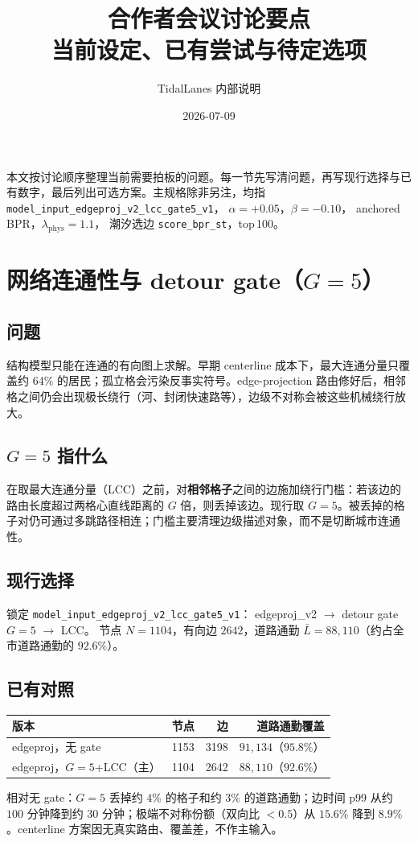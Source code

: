 \documentclass[11pt,a4paper]{article}
\title{合作者会议讨论要点\\[0.4em]
\large 当前设定、已有尝试与待定选项}
\author{TidalLanes 内部说明}
\date{2026-07-09}
\begin{document}
\maketitle

\noindent
本文按讨论顺序整理当前需要拍板的问题。每一节先写清问题，再写现行选择与已有数字，最后列出可选方案。主规格除非另注，均指
\texttt{model\_input\_edgeproj\_v2\_lcc\_gate5\_v1}，
$\alpha=+0.05$，$\beta=-0.10$，
anchored BPR，$\lambda_{\mathrm{phys}}=1.1$，
潮汐选边 \texttt{score\_bpr\_st}，top\,100。

\tableofcontents
\vspace{1em}

\section{网络连通性与 detour gate（$G=5$）}

\subsection*{问题}
结构模型只能在连通的有向图上求解。早期 centerline 成本下，最大连通分量只覆盖约 $64\%$ 的居民；孤立格会污染反事实符号。edge-projection 路由修好后，相邻格之间仍会出现极长绕行（河、封闭快速路等），边级不对称会被这些机械绕行放大。

\subsection*{$G=5$ 指什么}
在取最大连通分量（LCC）之前，对\textbf{相邻格子}之间的边施加绕行门槛：若该边的路由长度超过两格心直线距离的 $G$ 倍，则丢掉该边。现行取 $G=5$。被丢掉的格子对仍可通过多跳路径相连；门槛主要清理边级描述对象，而不是切断城市连通性。

\subsection*{现行选择}
锁定 \texttt{model\_input\_edgeproj\_v2\_lcc\_gate5\_v1}：
edgeproj\_v2 $\to$ detour gate $G=5$ $\to$ LCC。
节点 $N=1104$，有向边 $2642$，道路通勤 $\bar L=88{,}110$（约占全市道路通勤的 $92.6\%$）。

\subsection*{已有对照}
\begin{center}
\begin{tabular}{lrrr}
\toprule
版本 & 节点 & 边 & 道路通勤覆盖 \\
\midrule
edgeproj，无 gate & 1153 & 3198 & $91{,}134$（$95.8\%$） \\
edgeproj，$G=5$+LCC（主） & 1104 & 2642 & $88{,}110$（$92.6\%$） \\
\bottomrule
\end{tabular}
\end{center}
相对无 gate：$G=5$ 丢掉约 $4\%$ 的格子和约 $3\%$ 的道路通勤；边时间 p99 从约 $100$ 分钟降到约 $30$ 分钟；极端不对称份额（双向比 $<0.5$）从 $15.6\%$ 降到 $8.9\%$。centerline 方案因无真实路由、覆盖差，不作主输入。
\end{document}
